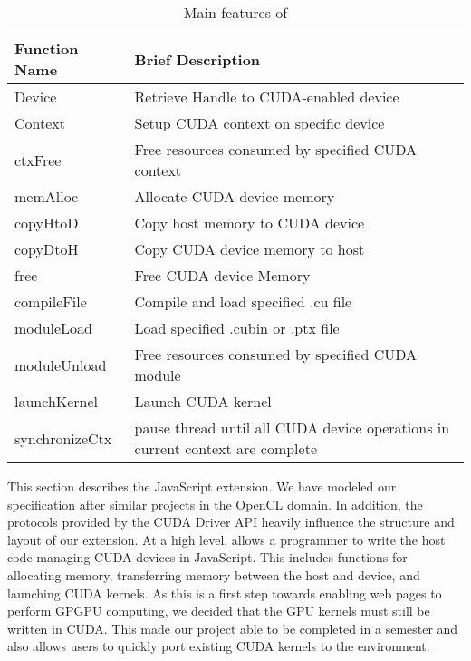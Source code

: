 
\begin{table}
\begin{center}
\begin{tabular}{| l | p{5.5cm} | }
\hline
Function Name & Brief Description \\
\hline
Device & Retrieve Handle to CUDA-enabled device \\
\hline
Context & Setup CUDA context on specific device \\
\hline
ctxFree & Free resources consumed by specified CUDA context\\
\hline
memAlloc & Allocate CUDA device memory \\
\hline
copyHtoD  & Copy host memory to CUDA device \\
\hline
copyDtoH & Copy CUDA device memory to host \\
\hline
free & Free CUDA device Memory \\
\hline
compileFile & Compile and load specified .cu file \\
\hline
moduleLoad & Load specified .cubin or .ptx file \\
\hline
moduleUnload & Free resources consumed by specified CUDA module\\
\hline
launchKernel & Launch CUDA kernel\\
\hline
synchronizeCtx & pause thread until all CUDA device operations in current context are complete \\
\hline
\end{tabular}
\end{center}
\caption{Main features of \name}
\label{webcudaSpec}
\end{table}

This section describes the \name JavaScript extension. We have modeled our
specification after similar projects \cite{webCL, safariCL, nokiaCL, chromeCL} in
the OpenCL domain.  In addition, the protocols provided by the CUDA Driver API
\cite{cudaAPI} heavily influence the structure and layout of our extension. At a
high level, \name allows a programmer to write the host code managing CUDA
devices in JavaScript. This includes functions for allocating memory,
transferring memory between the host and device, and launching CUDA kernels. As
this is a first step towards enabling web pages to perform GPGPU computing, we
decided that the GPU kernels must still be written in CUDA. This made our
project able to be completed in a semester and also allows users to quickly port
existing CUDA kernels to the \name environment.


